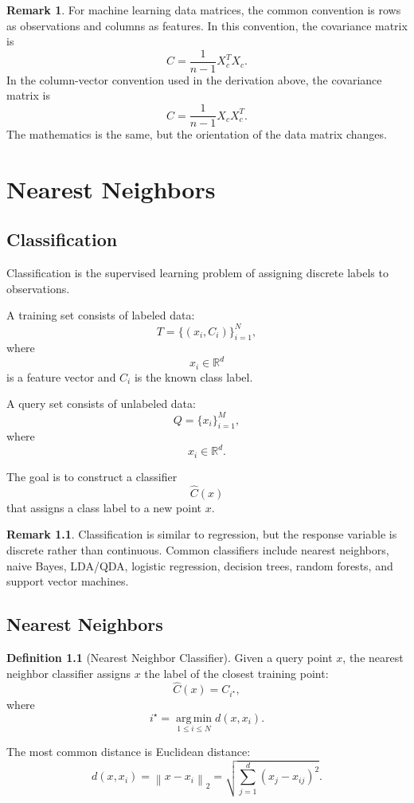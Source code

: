 \documentclass[12pt,oneside]{book}
\numberwithin{equation}{section}
\theoremstyle{definition}
\newtheorem{definition}{Definition}[section]
\newtheorem{remark}{Remark}[section]
\theoremstyle{plain}
\theoremstyle{remark}
\newcommand{\R}{\mathbb{R}}
\newcommand{\argmin}{\operatorname*{arg\,min}}
\newcommand{\norm}[1]{\left\lVert #1 \right\rVert}
\begin{document}
\begin{remark}
For machine learning data matrices, the common convention is rows as observations and columns as features. In this convention, the covariance matrix is
\[
C=\frac{1}{n-1}X_c^TX_c.
\]
In the column-vector convention used in the derivation above, the covariance matrix is
\[
C=\frac{1}{n-1}X_cX_c^T.
\]
The mathematics is the same, but the orientation of the data matrix changes.
\end{remark}

\chapter{Nearest Neighbors}

\section{Classification}

Classification is the supervised learning problem of assigning discrete labels to observations.

A training set consists of labeled data:
\[
T=\{(x_i,C_i)\}_{i=1}^N,
\]
where
\[
x_i \in \R^d
\]
is a feature vector and $C_i$ is the known class label.

A query set consists of unlabeled data:
\[
Q=\{x_i\}_{i=1}^M,
\]
where
\[
x_i \in \R^d.
\]

The goal is to construct a classifier
\[
\hat{C}(x)
\]
that assigns a class label to a new point $x$.

\begin{remark}
Classification is similar to regression, but the response variable is discrete rather than continuous. Common classifiers include nearest neighbors, naive Bayes, LDA/QDA, logistic regression, decision trees, random forests, and support vector machines.
\end{remark}

\section{Nearest Neighbors}

\begin{definition}[Nearest Neighbor Classifier]
Given a query point $x$, the nearest neighbor classifier assigns $x$ the label of the closest training point:
\[
\hat{C}(x)=C_{i^\star},
\]
where
\[
i^\star=\argmin_{1\leq i\leq N} d(x,x_i).
\]
\end{definition}

The most common distance is Euclidean distance:
\[
d(x,x_i)=\norm{x-x_i}_2
=
\sqrt{\sum_{j=1}^d (x_j-x_{ij})^2}.
\]
\end{document}
